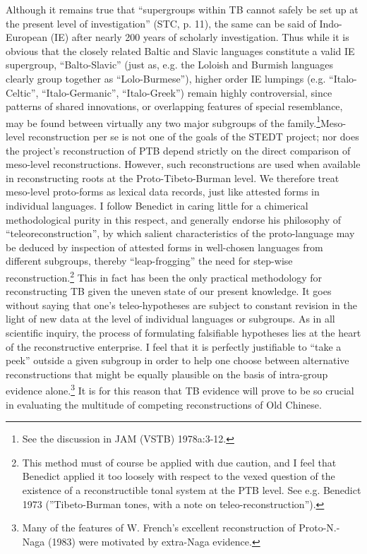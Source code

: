 Although it remains true that “supergroups within TB cannot safely be set up at the present level of investigation” (STC, p. 11), the same can be said of Indo-European (IE) after nearly 200 years of scholarly investigation. Thus while it is obvious that the closely related Baltic and Slavic languages constitute a valid IE supergroup, “Balto-Slavic” (just as, e.g. the Loloish and Burmish languages clearly group together as “Lolo-Burmese”), higher order IE lumpings (e.g. “Italo-Celtic”, “Italo-Germanic”, “Italo-Greek”) remain highly controversial, since patterns of shared innovations, or overlapping features of special resemblance, may be found between virtually any two major subgroups of the family.\footnote{See the discussion in JAM (VSTB) 1978a:3-12.}Meso-level reconstruction per se is not one of the goals of the STEDT project; nor does the project’s reconstruction of PTB depend strictly on the direct comparison of meso-level reconstructions. However, such reconstructions are used when available in reconstructing roots at the Proto-Tibeto-Burman level. We therefore treat meso-level proto-forms as lexical data records, just like attested forms in individual languages. I follow Benedict in caring little for a chimerical methodological purity in this respect, and generally endorse his philosophy of “teleoreconstruction”, by which salient characteristics of the proto-language may be deduced by inspection of attested forms in well-chosen languages from different subgroups, thereby “leap-frogging” the need for step-wise reconstruction.\footnote{This method must of course be applied with due caution, and I feel that Benedict applied it too loosely with respect to the vexed question of the existence of a reconstructible tonal system at the PTB level. See e.g. Benedict 1973 (”Tibeto-Burman tones, with a note on teleo-reconstruction”).} This in fact has been the only practical methodology for reconstructing TB given the uneven state of our present knowledge. It goes without saying that one’s teleo-hypotheses are subject to constant revision in the light of new data at the level of individual languages or subgroups. As in all scientific inquiry, the process of formulating falsifiable hypotheses lies at the heart of the reconstructive enterprise. I feel that it is perfectly justifiable to “take a peek” outside a given subgroup in order to help one choose between alternative reconstructions that might be equally plausible on the basis of intra-group evidence alone.\footnote{Many of the features of W. French’s excellent reconstruction of Proto-N.-Naga (1983) were motivated by extra-Naga evidence.} It is for this reason that TB evidence will prove to be so crucial in evaluating the multitude of competing reconstructions of Old Chinese.


